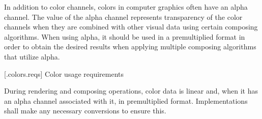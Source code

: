 \pnum
In addition to color channels, colors in computer graphics often have an alpha channel. The value of the alpha channel represents transparency of the color channels when they are combined with other visual data using certain composing algorithms. When using alpha, it should be used in a premultiplied format in order to obtain the desired results when applying multiple composing algorithms that utilize alpha.

 [\iotwod.colors.reqs] {Color usage requirements}

\pnum
During rendering and composing operations, color data is linear and, when it has an alpha channel associated with it, in premultiplied format. Implementations shall make any necessary conversions to ensure this. 

\addtocounter{SectionDepthBase}{1}

\addtocounter{SectionDepthBase}{-1}
